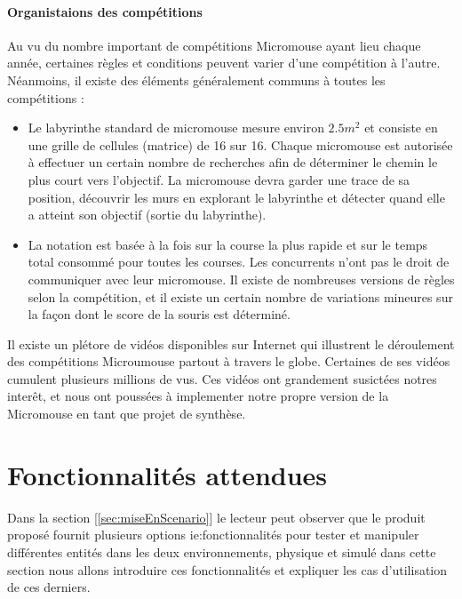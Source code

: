\paragraph{Organistaions des compétitions}
   Au vu du nombre important de compétitions Micromouse ayant lieu chaque année,
certaines règles et conditions peuvent varier d'une compétition à l'autre.
Néanmoins, il existe des éléments généralement communs à toutes les
compétitions : 
\\ 

\begin{itemize}

\item
   Le labyrinthe standard de micromouse mesure environ $2.5m^2$
et consiste en une grille de cellules (matrice) de 16 sur 16. Chaque micromouse
est autorisée à effectuer un certain nombre de recherches afin de déterminer le
chemin le plus court vers l'objectif.  La micromouse devra garder une trace de
sa position, découvrir les murs en explorant le labyrinthe et détecter quand
elle a atteint son objectif (sortie du labyrinthe). \\

\item
   La notation est basée à la fois sur la course la plus rapide et sur le temps
total consommé pour toutes les courses. Les concurrents n'ont pas le droit de
communiquer avec leur micromouse.  Il existe de nombreuses versions de règles
selon la compétition, et il existe un certain nombre de variations mineures sur
la façon dont le score de la souris est déterminé. \\

\end{itemize}

Il existe un plétore de vidéos disponibles sur Internet qui illustrent le déroulement des compétitions Microumouse partout à travers le globe. Certaines de ses vidéos cumulent plusieurs millions de vus.
Ces vidéos ont grandement susictées notres interêt, et nous ont poussées à implementer notre propre version de la Micromouse en tant que projet de synthèse.
\clearpage
\section{Fonctionnalités attendues} \label{sec:foncAttendues}
   Dans la section [\ref{sec:miseEnScenario}] le lecteur peut observer que le
produit proposé fournit plusieurs options ie:fonctionnalités pour tester et
manipuler différentes entités dans les deux environnements, physique et
simulé dans cette section nous allons introduire ces fonctionnalités et
expliquer les cas d'utilisation de ces derniers.

